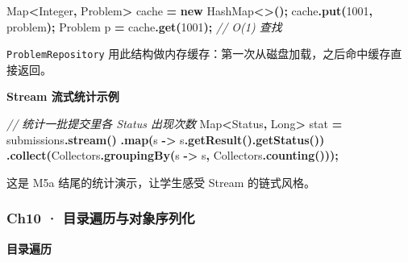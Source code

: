 \documentclass[
  11pt,
]{ctexart}
\newenvironment{Shaded}{\begin{snugshade}}{\end{snugshade}}
\newcommand{\BuiltInTok}[1]{#1}
\newcommand{\CommentTok}[1]{\textcolor[rgb]{0.56,0.35,0.01}{\textit{#1}}}
\newcommand{\DecValTok}[1]{\textcolor[rgb]{0.00,0.00,0.81}{#1}}
\newcommand{\FunctionTok}[1]{\textcolor[rgb]{0.13,0.29,0.53}{\textbf{#1}}}
\newcommand{\KeywordTok}[1]{\textcolor[rgb]{0.13,0.29,0.53}{\textbf{#1}}}
\newcommand{\NormalTok}[1]{#1}
\newcommand{\OperatorTok}[1]{\textcolor[rgb]{0.81,0.36,0.00}{\textbf{#1}}}
\begin{document}
\begin{Shaded}
\begin{Highlighting}[]
\BuiltInTok{Map}\OperatorTok{\textless{}}\BuiltInTok{Integer}\OperatorTok{,}\NormalTok{ Problem}\OperatorTok{\textgreater{}}\NormalTok{ cache }\OperatorTok{=} \KeywordTok{new} \BuiltInTok{HashMap}\OperatorTok{\textless{}\textgreater{}();}
\NormalTok{cache}\OperatorTok{.}\FunctionTok{put}\OperatorTok{(}\DecValTok{1001}\OperatorTok{,}\NormalTok{ problem}\OperatorTok{);}
\NormalTok{Problem p }\OperatorTok{=}\NormalTok{ cache}\OperatorTok{.}\FunctionTok{get}\OperatorTok{(}\DecValTok{1001}\OperatorTok{);}  \CommentTok{// O(1) 查找}
\end{Highlighting}
\end{Shaded}

\texttt{ProblemRepository}
用此结构做内存缓存：第一次从磁盘加载，之后命中缓存直接返回。

\textbf{Stream 流式统计示例}

\begin{Shaded}
\begin{Highlighting}[]
\CommentTok{// 统计一批提交里各 Status 出现次数}
\BuiltInTok{Map}\OperatorTok{\textless{}}\NormalTok{Status}\OperatorTok{,} \BuiltInTok{Long}\OperatorTok{\textgreater{}}\NormalTok{ stat }\OperatorTok{=}\NormalTok{ submissions}\OperatorTok{.}\FunctionTok{stream}\OperatorTok{()}
    \OperatorTok{.}\FunctionTok{map}\OperatorTok{(}\NormalTok{s }\OperatorTok{{-}\textgreater{}}\NormalTok{ s}\OperatorTok{.}\FunctionTok{getResult}\OperatorTok{().}\FunctionTok{getStatus}\OperatorTok{())}
    \OperatorTok{.}\FunctionTok{collect}\OperatorTok{(}\NormalTok{Collectors}\OperatorTok{.}\FunctionTok{groupingBy}\OperatorTok{(}\NormalTok{s }\OperatorTok{{-}\textgreater{}}\NormalTok{ s}\OperatorTok{,}\NormalTok{ Collectors}\OperatorTok{.}\FunctionTok{counting}\OperatorTok{()));}
\end{Highlighting}
\end{Shaded}

这是 M5a 结尾的统计演示，让学生感受 Stream 的链式风格。

\hypertarget{ch10-ux76eeux5f55ux904dux5386ux4e0eux5bf9ux8c61ux5e8fux5217ux5316}{%
\subsubsection{Ch10 ·
目录遍历与对象序列化}\label{ch10-ux76eeux5f55ux904dux5386ux4e0eux5bf9ux8c61ux5e8fux5217ux5316}}

\textbf{目录遍历}
\end{document}
